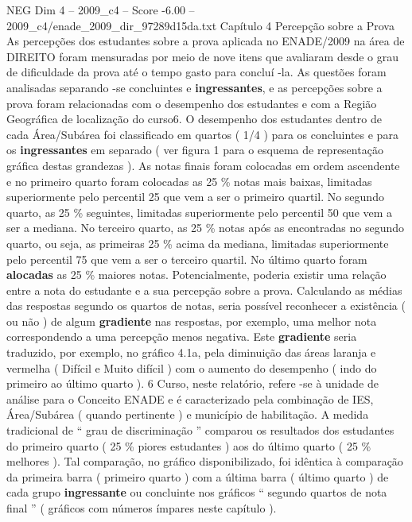 \begin{textsample}{NEG Dim 4 – 2009\_c4 – Score -6.00 – 2009\_c4/enade\_2009\_dir\_97289d15da.txt}  \label{ex:f4_neg_029}
Capítulo 4 Percepção sobre a Prova As percepções dos estudantes sobre a prova aplicada no ENADE/2009 na área de DIREITO foram mensuradas por meio de nove itens que avaliaram desde o grau de dificuldade da prova até o tempo gasto para concluí -la.
As questões foram analisadas separando -se concluintes e \textbf{ingressantes}, e as percepções sobre a prova foram relacionadas com o desempenho dos estudantes e com a Região Geográfica de localização do curso6.
O desempenho dos estudantes dentro de cada Área/Subárea foi classificado em quartos ( 1/4 ) para os concluintes e para os \textbf{ingressantes} em separado ( ver figura 1 para o esquema de representação gráfica destas grandezas ).
As notas finais foram colocadas em ordem ascendente e no primeiro quarto foram colocadas as 25 \% notas mais baixas, limitadas superiormente pelo percentil 25 que vem a ser o primeiro quartil.
No segundo quarto, as 25 \% seguintes, limitadas superiormente pelo percentil 50 que vem a ser a mediana.
No terceiro quarto, as 25 \% notas após as encontradas no segundo quarto, ou seja, as primeiras 25 \% acima da mediana, limitadas superiormente pelo percentil 75 que vem a ser o terceiro quartil.
No último quarto foram \textbf{alocadas} as 25 \% maiores notas.
Potencialmente, poderia existir uma relação entre a nota do estudante e a sua percepção sobre a prova.
Calculando as médias das respostas segundo os quartos de notas, seria possível reconhecer a existência ( ou não ) de algum \textbf{gradiente} nas respostas, por exemplo, uma melhor nota correspondendo a uma percepção menos negativa.
Este \textbf{gradiente} seria traduzido, por exemplo, no gráfico 4.1a, pela diminuição das áreas laranja e vermelha ( Difícil e Muito difícil ) com o aumento do desempenho ( indo do primeiro ao último quarto ). 6 Curso, neste relatório, refere -se à unidade de análise para o Conceito ENADE e é caracterizado pela combinação de IES, Área/Subárea ( quando pertinente ) e município de habilitação.
A medida tradicional de “ grau de discriminação ” comparou os resultados dos estudantes do primeiro quarto ( 25 \% piores estudantes ) aos do último quarto ( 25 \% melhores ).
Tal comparação, no gráfico disponibilizado, foi idêntica à comparação da primeira barra ( primeiro quarto ) com a última barra ( último quarto ) de cada grupo \textbf{ingressante} ou concluinte nos gráficos “ segundo quartos de nota final ” ( gráficos com números ímpares neste capítulo ).

\end{textsample}
